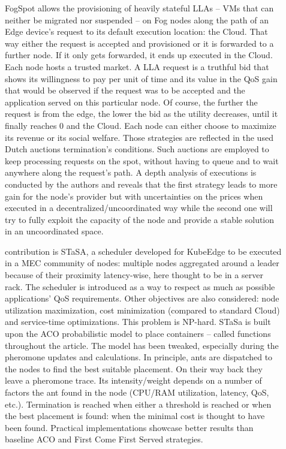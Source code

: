 \documentclass[11pt]{sdm}
\begin{document}
\begin{description}
	\item[] FogSpot allows the provisioning of heavily stateful \glspl{LLA} -- \glspl{VM} that can neither be migrated nor suspended -- on Fog nodes along the path of an Edge device's request to its default execution location: the Cloud. That way either the request is accepted and provisioned or it is forwarded to a further node. If it only gets forwarded, it ends up executed in the Cloud.
		Each node hosts a trusted market. A \gls{LLA} request is a truthful bid that shows its willingness to pay per unit of time and its value in the \gls{QoS} gain that would be observed if the request was to be accepted and the application served on this particular node. Of course, the further the request is from the edge, the lower the bid as the utility decreases, until it finally reaches 0 and the Cloud.
		Each node can either choose to maximize its revenue or its social welfare. Those strategies are reflected in the used Dutch auctions termination's conditions. Such auctions are employed to keep processing requests on the spot, without having to queue and to wait anywhere along the request's path. A depth analysis of executions is conducted by the authors and reveals that the first strategy leads to more gain for the node's provider but with uncertainties on the prices when executed in a decentralized/uncoordinated way while the second one will try to fully exploit the capacity of the node and provide a stable solution in an uncoordinated space.

	\item[] contribution is STaSA, a scheduler developed for KubeEdge to be executed in a \gls{MEC} community of nodes: multiple nodes aggregated around a leader because of their proximity latency-wise, here thought to be in a server rack. The scheduler is introduced as a way to respect as much as possible applications' \gls{QoS} requirements. Other objectives are also considered: node utilization maximization, cost minimization (compared to standard Cloud) and service-time optimizations. This problem is NP-hard. STaSa is built upon the \gls{ACO} probabilistic model to place containers -- called functions throughout the article. The model has been tweaked, especially during the pheromone updates and calculations. In principle, ants are dispatched to the nodes to find the best suitable placement. On their way back they leave a pheromone trace. Its intensity/weight depends on a number of factors the ant found in the node (CPU/RAM utilization, latency, \gls{QoS}, etc.). Termination is reached when either a threshold is reached or when the best placement is found: when the minimal cost is thought to have been found. Practical implementations showcase better results than baseline \gls{ACO} and First Come First Served strategies.


\end{description}
\end{document}
